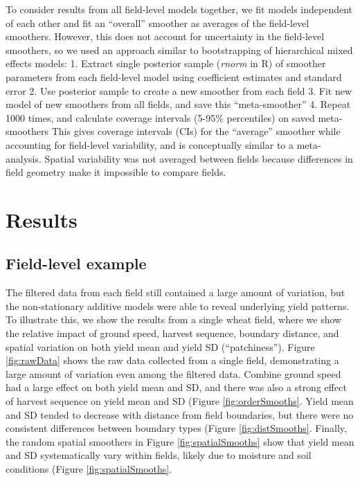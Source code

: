 \documentclass[]{elsarticle} %
\begin{document}
To consider results from all field-level models together, we fit models independent of each other and fit an ``overall'' smoother as averages of the field-level smoothers.
However, this does not account for uncertainty in the field-level smoothers, so we used an approach similar to bootstrapping of hierarchical mixed effects models:
1. Extract single posterior sample (\emph{rnorm} in R) of smoother parameters from each field-level model using coefficient estimates and standard error
2. Use posterior sample to create a new smoother from each field
3. Fit new model of new smoothers from all fields, and save this ``meta-smoother''
4. Repeat 1000 times, and calculate coverage intervals (5-95\% percentiles) on saved meta-smoothers
This gives coverage intervals (CIs) for the ``average'' smoother while accounting for field-level variability, and is conceptually similar to a meta-analysis.
Spatial variability was not averaged between fields because differences in field geometry make it impossible to compare fields.

\hypertarget{results}{%
\section{Results}\label{results}}

\hypertarget{field-level-example}{%
\subsection{Field-level example}\label{field-level-example}}

The filtered data from each field still contained a large amount of variation, but the non-stationary additive models were able to reveal underlying yield patterns.
To illustrate this, we show the results from a single wheat field, where we show the relative impact of ground speed, harvest sequence, boundary distance, and spatial variation on both yield mean and yield SD (``patchiness'').
Figure \ref{fig:rawData} shows the raw data collected from a single field, demonstrating a large amount of variation even among the filtered data.
Combine ground speed had a large effect on both yield mean and SD, and there was also a strong effect of harvest sequence on yield mean and SD (Figure \ref{fig:orderSmooths}.
Yield mean and SD tended to decrease with distance from field boundaries, but there were no consistent differences between boundary types (Figure \ref{fig:distSmooths}.
Finally, the random spatial smoothers in Figure \ref{fig:spatialSmooths} show that yield mean and SD systematically vary within fields, likely due to moisture and soil conditions (Figure \ref{fig:spatialSmooths}.
\end{document}

